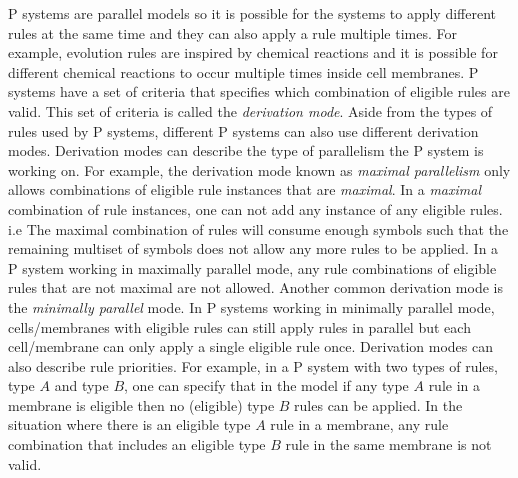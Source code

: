 \documentclass[12pt,A4]{article}
\begin{document}
P systems are parallel models so it is possible for the systems to apply different rules at
the same time and they can also apply a rule multiple times. For example, evolution rules are 
inspired by chemical reactions and it is possible for different chemical reactions to occur multiple
times inside cell membranes. P systems have a set of criteria that specifies which combination of
eligible rules are valid. This set of criteria is called the \emph{derivation mode}. Aside from the
types of rules used by P systems, different P systems can also use different derivation modes.
Derivation modes can describe the type of parallelism the P system is working on. For example, the
derivation mode known as \emph{maximal parallelism} only allows combinations of eligible rule 
instances that are \emph{maximal}. In a \emph{maximal} combination of rule instances, one can not
add any instance of any eligible rules. i.e The maximal combination of rules will consume enough 
symbols such that the remaining multiset of symbols does not allow any more rules to be applied.
In a P system working in maximally parallel mode, any rule combinations of eligible rules that are
not maximal are not allowed. Another common derivation mode is the \emph{minimally parallel} mode. 
In P systems working in minimally parallel mode, cells/membranes with eligible rules can still apply
rules in parallel but each cell/membrane can only apply a single eligible rule once. Derivation
modes can also describe rule priorities. For example, in a P system with two types of rules, type
$A$ and type $B$, one can specify that in the model if any type $A$ rule in a membrane is eligible 
then no (eligible) type $B$ rules can be applied. In the situation where there is an eligible type
$A$ rule in a membrane, any rule combination that includes an eligible type $B$ rule in the same 
membrane is not valid. 
\end{document}
